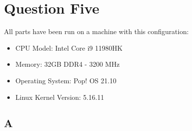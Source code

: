 \documentclass[12pt]{article}
\begin{document}
\newpage

\section{Question Five}

All parts have been run on a machine with this configuration:

\begin{itemize}
	\item CPU Model: Intel Core i9 11980HK
	\item Memory: 32GB DDR4 - 3200 MHz
	\item Operating System: Pop! OS 21.10
	\item Linux Kernel Version: 5.16.11
\end{itemize}

\subsection{A}
\end{document}
